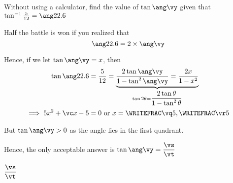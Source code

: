

\DIVIDE{}\vy
\MULTIPLY{}\vc
\SQUARE\va\vm
\SQUARE\vb\vn
\ADD\vm\vn\vo
\SQRT\vo\vp

\ADD{-\vb}\vp\vq
\SUBTRACT{-\vb}\vp\vr
\FRACTIONSIMPLIFY\vq\va\vs\vt

\question[3] Without using a calculator, find the value of $\tan\ang\vy$ given that $\tan^{-1}\frac\va\vb=\ang\vz$

\watchout

\begin{solution}[\halfpage]
  Half the battle is won if you realized that 
  \[ \ang\vz = 2\times \ang\vy\]

  Hence, if we let $\tan\ang\vy=x$, then 
  \begin{align}
    \tan\ang\vz &= \dfrac\va\vb = \underbrace{\dfrac{2\tan\ang\vy}{1-\tan^2\ang\vy} = \dfrac{2x}{1-x^2}}_{\tan 2\theta=\dfrac{2\tan\theta}{1-\tan^2\theta}} \\
    \implies \va x^2 +\vc x -\va &= 0\text{ or } x = \WRITEFRAC\vq\va,\WRITEFRAC\vr\va
  \end{align}

  But $\tan\ang\vy > 0$ as the angle lies in the first quadrant. 

  Hence, the only acceptable answer is $\tan\ang\vy=\dfrac\vs\vt$
\end{solution}

\ifprintanswers\begin{codex}$\dfrac\vs\vt$\end{codex}\fi
